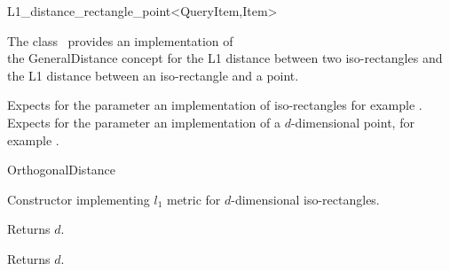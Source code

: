 

\begin{ccRefClass}{L1_distance_rectangle_point<QueryItem,Item>}  %


\ccDefinition

The class \ccRefName\ provides an implementation of \\
the GeneralDistance concept
for the L1 distance between two iso-rectangles and the L1 distance between an iso-rectangle
and a point.


\ccParameters

Expects for the parameter 
 an implementation of iso-rectangles
for example .
Expects for the parameter  an implementation
of a $d$-dimensional point, for example .

\ccIsModel

OrthogonalDistance

\ccTypes


\ccCreation
{}  %


{Constructor implementing $l_1$ metric for
$d$-dimensional iso-rectangles.}


 {Returns $d$.}

 {Returns $d$.}


\end{ccRefClass}
